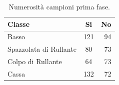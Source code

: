 \begin{table}[h!]
	\begin{center}
		\begin{tabular}{l|c|r} %
			\textbf{Classe} & \textbf{Si} & \textbf{No}\\
			\hline
			Basso & 121 & 94\\
			Spazzolata di Rullante & 80 & 73\\
			Colpo di Rullante & 64 & 73\\
			Cassa & 132 & 72
		\end{tabular}
		\caption{Numerosità campioni prima fase.}
		\label{tab:numerosità_1}
	\end{center}
\end{table}

